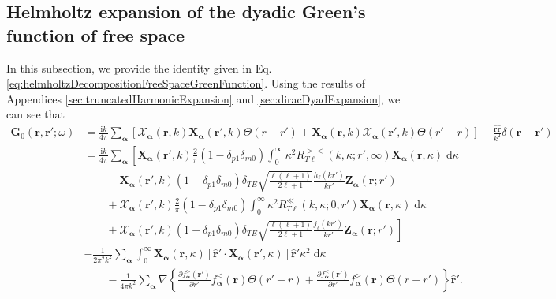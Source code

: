 \subsection{Helmholtz expansion of the dyadic Green's function of free space}\label{sec:helmholtzDecompositionFreeSpaceGreenFunction}

In this subsection, we provide the identity given in Eq. \eqref{eq:helmholtzDecompositionFreeSpaceGreenFunction}. Using the results of Appendices \ref{sec:truncatedHarmonicExpansion} and \ref{sec:diracDyadExpansion}, we can see that
\begin{equation}
\begin{split}
\mathbf{G}_0(\mathbf{r},\mathbf{r}';\omega) &= \frac{\mathrm{i}k}{4\pi}\sum_{\bm{\alpha}}\left[\bm{\mathcal{X}}_{\bm{\alpha}}(\mathbf{r},k)\mathbf{X}_{\bm{\alpha}}(\mathbf{r}',k)\Theta(r - r') + \mathbf{X}_{\bm{\alpha}}(\mathbf{r},k) \bm{\mathcal{X}}_{\bm{\alpha}}(\mathbf{r}',k)\Theta(r' - r)\right] - \frac{\hat{\mathbf{r}}\hat{\mathbf{r}}}{k^2}\delta(\mathbf{r} - \mathbf{r}')\\[1.0em]
&= \frac{\mathrm{i}k}{4\pi}\sum_{\bm{\alpha}}\left[\mathbf{X}_{\bm{\alpha}}(\mathbf{r}',k)\frac{2}{\pi}(1 - \delta_{p1}\delta_{m0})\int_0^\infty\kappa^2R_{T\ell}^{><}(k,\kappa;r',\infty)\mathbf{X}_{\bm{\alpha}}(\mathbf{r},\kappa)\;\mathrm{d}\kappa\right.\\
&\qquad- \mathbf{X}_{\bm{\alpha}}(\mathbf{r}',k)(1 - \delta_{p1}\delta_{m0})\delta_{TE}\sqrt{\frac{\ell(\ell + 1)}{2\ell + 1}}\frac{h_\ell(kr')}{kr'}\mathbf{Z}_{\bm{\alpha}}(\mathbf{r};r')\\
&\qquad+ \bm{\mathcal{X}}_{\bm{\alpha}}(\mathbf{r}',k)\frac{2}{\pi}(1 - \delta_{p1}\delta_{m0})\int_0^\infty\kappa^2R_{T\ell}^\ll(k,\kappa;0,r')\mathbf{X}_{\bm{\alpha}}(\mathbf{r},\kappa)\;\mathrm{d}\kappa\\
&\qquad+\left.\bm{\mathcal{X}}_{\bm{\alpha}}(\mathbf{r}',k)(1 - \delta_{p1}\delta_{m0})\delta_{TE}\sqrt{\frac{\ell(\ell + 1)}{2\ell + 1}}\frac{j_\ell(kr')}{kr'}\mathbf{Z}_{\bm{\alpha}}(\mathbf{r};r')\right]\\
&- \frac{1}{2\pi^2k^2}\sum_{\bm{\alpha}}\int_0^\infty\mathbf{X}_{\bm{\alpha}}(\mathbf{r},\kappa)\left[\hat{\mathbf{r}}'\cdot\mathbf{X}_{\bm{\alpha}}(\mathbf{r}',\kappa)\right]\hat{\mathbf{r}}'\kappa^2\;\mathrm{d}\kappa\\
&\qquad - \frac{1}{4\pi k^2}\sum_{\bm{\alpha}}\nabla\left\{\frac{\partial f_{\bm{\alpha}}^>(\mathbf{r}')}{\partial r'}f_{\bm{\alpha}}^<(\mathbf{r})\Theta(r' - r) + \frac{\partial f_{\bm{\alpha}}^<(\mathbf{r}')}{\partial r'}f_{\bm{\alpha}}^>(\mathbf{r})\Theta(r - r')\right\}\hat{\mathbf{r}}'.
\end{split}
\end{equation}
